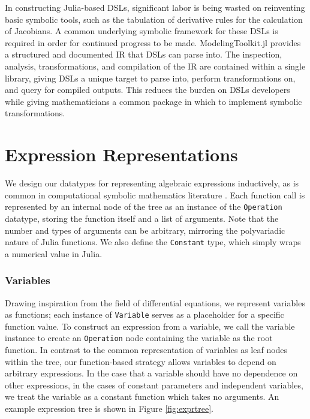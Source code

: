 \documentclass{juliacon}
\begin{document}

In constructing Julia-based DSLs, significant labor is being wasted on reinventing basic symbolic tools, such as the tabulation of derivative rules for the calculation of Jacobians. A common underlying symbolic framework for these DSLs is required in order for continued progress to be made. ModelingToolkit.jl provides a structured and documented IR that DSLs can parse into. The inspection, analysis, transformations, and compilation of the IR are contained within a single library, giving DSLs a unique target to parse into, perform transformations on, and query for compiled outputs. This reduces the burden on DSLs developers while giving mathematicians a common package in which to implement symbolic transformations.


\section{Expression Representations \label{sec:expression}}

We design our datatypes for representing algebraic expressions inductively, as is common in computational symbolic mathematics literature \cite{traat}. Each function call is represented by an internal node of the tree as an instance of the \texttt{Operation} datatype, storing the function itself and a list of arguments. Note that the number and types of arguments can be arbitrary, mirroring the polyvariadic nature of Julia functions. We also define the \texttt{Constant} type, which simply wraps a numerical value in Julia.

\subsubsection{Variables} Drawing inspiration from the field of differential equations, we represent variables as functions; each instance of \texttt{Variable} serves as a placeholder for a specific function value. To construct an expression from a variable, we call the variable instance to create an \texttt{Operation} node containing the variable as the root function. In contrast to the common representation of variables as leaf nodes within the tree, our function-based strategy allows variables to depend on arbitrary expressions. In the case that a variable should have no dependence on other expressions, in the cases of constant parameters and independent variables, we treat the variable as a constant function which takes no arguments. An example expression tree is shown in Figure \ref{fig:exprtree}.
\end{document}
